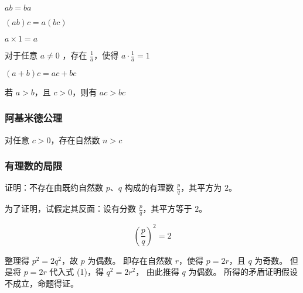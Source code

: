 \begin{theorem}
$ab=ba$ 
\end{theorem}

\begin{theorem}
$(ab)c=a(bc)$ 
\end{theorem}

\begin{theorem}
$a \times 1 = a$ 
\end{theorem}

\begin{theorem}
对于任意 $a\neq 0$ ，存在 $\frac{1}{a}$，使得 $a \cdot \frac{1}{a} = 1$ 
\end{theorem}

\begin{theorem}
$(a+b)c=ac+bc$ 
\end{theorem}

\begin{theorem}
若 $a>b$，且 $c>0$，则有 $ac>bc$ 
\end{theorem}

\subsubsection{阿基米德公理}

\begin{theorem}
对任意 $c>0$，存在自然数 $n>c$ 
\end{theorem}

\subsubsection{有理数的局限}

\begin{quiz}
证明：不存在由既约自然数 $p$、$q$ 构成的有理数 $\frac{p}{q}$，其平方为 $2$。
\end{quiz}

为了证明，试假定其反面：设有分数 $\frac{p}{q}$，其平方等于 $2$。

\begin{equation}
\left( \frac{p}{q}\right)^2 = 2
\end{equation}

整理得 $p^2=2q^2$，故 $p$ 为偶数。
即存在自然数 $r$，使得 $p = 2r$，且 $q$ 为奇数。
但是将 $p = 2r$ 代入式 (1)，得 $q^2 = 2r^2$，
由此推得 $q$ 为偶数。
所得的矛盾证明假设不成立，命题得证。
